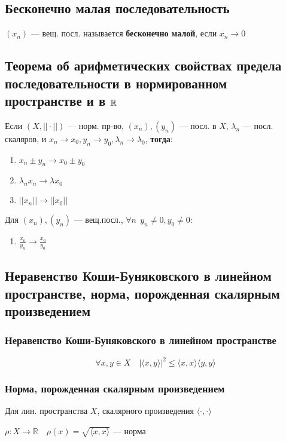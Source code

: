 \subsection{Бесконечно малая последовательность}

$(x_n)$ --- вещ. посл. называется \textbf{бесконечно малой}, если $x_n\to 0$

\subsection{Теорема об арифметических свойствах предела последовательности в нормированном пространстве и в $\operatorname*{\mathbb{R}}$}

Если $(X, ||\cdot||)$ --- норм. пр-во, $(x_n),(y_n)$ --- посл. в $X$, $\lambda_n$ ---
посл. скаляров, и $x_n\to x_0, y_n\to y_0, \lambda_n\to \lambda_0$, \textbf{тогда}:
\begin{enumerate}
\item $x_n\pm y_n\to x_0\pm y_0$
\item $\lambda_nx_n\to \lambda x_0$
\item $||x_n||\to||x_0||$
\end{enumerate}

Для $(x_n),(y_n)$ 
--- вещ.посл., $\forall n \ \ y_n\not =0, y_0\not = 0$:
\begin{enumerate}[resume]
\item $\frac{x_n}{y_n}\to\frac{x_0}{y_0}$
\end{enumerate}

\subsection{Неравенство Коши-Буняковского в линейном пространстве, норма, порожденная скалярным произведением}

\subsubsection{Неравенство Коши-Буняковского в линейном пространстве}
$$\forall x,y\in X\quad |\langle x,y\rangle|^2\leq \langle x,x\rangle \langle y,y\rangle$$

\subsubsection{Норма, порожденная скалярным произведением}
Для лин. пространства $X$, скалярного произведения $\langle \cdot ,\cdot \rangle$

$\rho:X\to\mathbb{R} \quad \rho(x)=\sqrt{\langle x,x\rangle}$ --- норма

